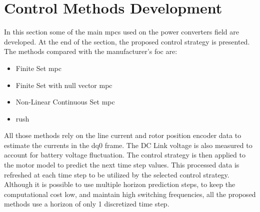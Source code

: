 \section{Control Methods Development}
\label{section:Control Methods Development}%

In this section some of the main \gls{mpc}s used on the power converters field are developed. At the end of the section, the proposed control strategy is presented. The methods compared with the manufacturer's \gls{foc} are:
\begin{itemize}
	\item Finite Set \gls{mpc}
	\item Finite Set with null vector \gls{mpc}
	\item Non-Linear Continuous Set \gls{mpc}
	\item \acrfull{rush}
\end{itemize}
All those methods rely on the line current and rotor position encoder data to estimate the currents in the dq0 frame. The DC Link voltage is also measured to account for battery voltage fluctuation. The control strategy is then applied to the motor model to predict the next time step values. This processed data is refreshed at each time step to be utilized by the selected control strategy.
Although it is possible to use multiple horizon prediction steps, to keep the computational cost low, and maintain high switching frequencies, all the proposed methods use a horizon of only 1 discretized time step. 

